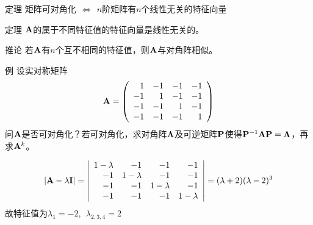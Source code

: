 \begin{frame}



  \begin{footnotesize}
    \begin{block}{定理}
      $\mbox{矩阵可对角化} ~~\Longleftrightarrow~~
      \mbox{$n$阶矩阵有$n$个线性无关的特征向量}$ 
    \end{block}
    
%
%
%
%
    \begin{block}{定理}
      $\mathbf{A}$的属于不同特征值的特征向量是线性无关的。
    \end{block}
    
%
    \begin{block}{推论}
      若$\mathbf{A}$有$n$个互不相同的特征值，则$\mathbf{A}$与对角阵相似。
    \end{block}
  \end{footnotesize}
\end{frame}

\begin{frame}
  \begin{footnotesize}
    \begin{exampleblock}{例}
      设实对称矩阵
      $$
      \mathbf{A}=\left(
      \begin{array}{rrrr}
        1&-1&-1&-1\\
        -1&1&-1&-1\\
        -1&-1&1&-1\\
        -1&-1&-1&1
      \end{array}
      \right)
      $$
      问$\mathbf{A}$是否可对角化？若可对角化，求对角阵$\mathbf{\Lambda}$及可逆矩阵$\mathbf{P}$使得$\mathbf{P}^{-1}\mathbf{A}\mathbf{P}=\mathbf{\Lambda}$，再求$\mathbf{A}^k$。
    \end{exampleblock}
    \pause\proofname
    $$
    |\mathbf{A}-\lambda\mathbf{I}|=\left|
      \begin{array}{rrrr}
        1-\lambda&-1&-1&-1\\
        -1&1-\lambda&-1&-1\\
        -1&-1&1-\lambda&-1\\
        -1&-1&-1&1-\lambda
      \end{array}
      \right|=(\lambda+2)(\lambda-2)^3
    $$
    故特征值为$\lambda_1=-2,~~\lambda_{2,3,4}=2$
  \end{footnotesize}
\end{frame}

